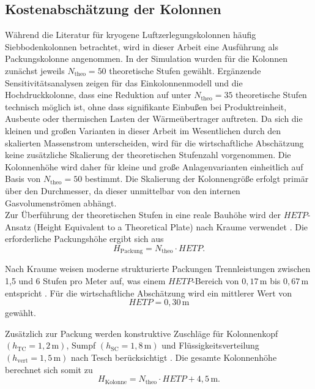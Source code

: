 \subsection*{Kostenabschätzung der Kolonnen}

Während die Literatur für kryogene Luftzerlegungskolonnen häufig
Siebbodenkolonnen betrachtet, wird in dieser Arbeit eine Ausführung als
Packungskolonne angenommen. In der Simulation wurden für die Kolonnen zunächst jeweils \(N_{\text{theo}}=50\) theoretische Stufen gewählt. 
Ergänzende Sensitivitätsanalysen zeigen für das Einkolonnenmodell und die Hochdruckkolonne, dass eine Reduktion auf unter \(N_{\text{theo}}=35\) theoretische Stufen technisch möglich ist, ohne dass signifikante Einbußen bei Produktreinheit, Ausbeute oder thermischen Lasten der Wärmeübertrager auftreten. Da sich die kleinen und großen Varianten in dieser Arbeit im Wesentlichen durch den skalierten Massenstrom unterscheiden, wird für die wirtschaftliche Abschätzung keine zusätzliche Skalierung der theoretischen Stufenzahl vorgenommen. Die Kolonnenhöhe wird daher für kleine und große Anlagenvarianten einheitlich auf Basis von \(N_{\text{theo}}=50\) bestimmt. Die Skalierung der Kolonnengröße erfolgt primär über den Durchmesser, da dieser unmittelbar von den internen Gasvolumenströmen abhängt.
\\
Zur Überführung der theoretischen Stufen in eine reale Bauhöhe wird der \(HETP\)-Ansatz (Height Equivalent to a Theoretical Plate) nach Kraume verwendet \cite{kraumeTransportvorgaengeVerfahrenstechnikGrundlagen2020}. Die erforderliche
Packungshöhe ergibt sich aus
\begin{equation}
H_{\text{Packung}} = N_{\text{theo}} \cdot HETP .
\end{equation}

Nach Kraume weisen moderne strukturierte Packungen Trennleistungen zwischen
1{,}5 und 6 Stufen pro Meter auf, was einem \(HETP\)-Bereich von
\(0{,}17\,\mathrm{m}\) bis \(0{,}67\,\mathrm{m}\) entspricht
\cite{kraumeTransportvorgaengeVerfahrenstechnikGrundlagen2020}. Für die wirtschaftliche Abschätzung wird
ein mittlerer Wert von
\begin{equation}
HETP = 0{,}30\,\mathrm{m}
\end{equation}
gewählt.

Zusätzlich zur Packung werden konstruktive Zuschläge für Kolonnenkopf
\((h_{\text{TC}}=1{,}2\,\mathrm{m})\), Sumpf
\((h_{\text{SC}}=1{,}8\,\mathrm{m})\) und Flüssigkeitsverteilung
\((h_{\text{vert}}=1{,}5\,\mathrm{m})\) nach Tesch berücksichtigt
\cite{teschExergybasedMethodsApplied}. Die gesamte Kolonnenhöhe berechnet sich somit zu
\begin{equation}
H_{\text{Kolonne}}
=
N_{\text{theo}} \cdot HETP + 4{,}5\,\mathrm{m}.
\end{equation}

